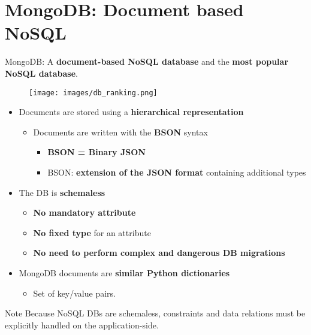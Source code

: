 \documentclass{beamer}[10pt, usepdftitle=false handout]
\begin{document}
	\section{MongoDB: Document based NoSQL}
	
	\begin{frame}
	
	MongoDB: A \textbf{document-based NoSQL database} and the \textbf{most popular NoSQL database}.
	\vspace*{0.6em}
	
	\begin{figure}
	\texttt{[image: images/db\_ranking.png]} 
	\end{figure}	
	
	
	\end{frame}
	
	\begin{frame}
	
	\begin{itemize}
		\item{Documents are stored using a \textbf{hierarchical representation}
			\begin{itemize}
				\item{Documents are written with the \textbf{BSON} syntax
					\begin{itemize}
						\item{\textbf{BSON = Binary JSON}}
						\item{BSON: \textbf{extension of the JSON format} containing additional types}	
					\end{itemize}}
			\end{itemize}					
		}
		\item{The DB is \textbf{schemaless}
			\begin{itemize}
				\item{\textbf{No mandatory attribute}}
				\item{\textbf{No fixed type} for an attribute}
				\item{\textbf{No need to perform complex and dangerous DB migrations}}
			\end{itemize}			
		}	
		\item{MongoDB documents are \textbf{similar Python dictionaries} 
			\begin{itemize}
				\item{Set of key/value pairs.}
			\end{itemize}}	
	\end{itemize}

\begin{block}{Note}
Because NoSQL DBs are schemaless, constraints and data relations must be explicitly handled on the application-side.
\end{block}

	\end{frame}
\end{document}
